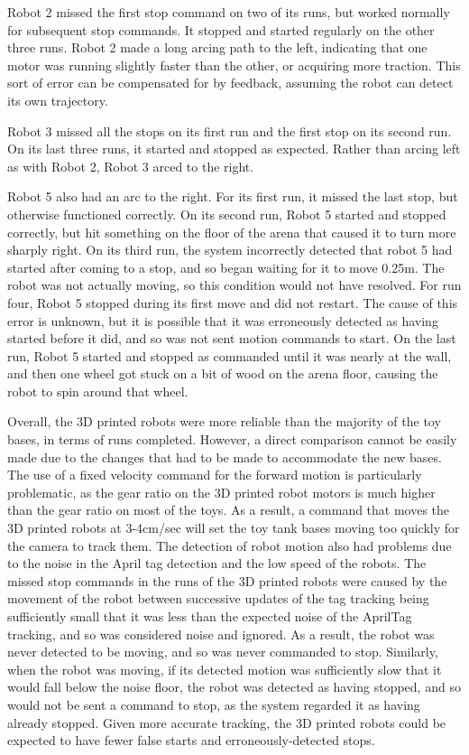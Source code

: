 Robot 2 missed the first stop command on two of its runs, but worked normally for subsequent stop commands. 
It stopped and started regularly on the other three runs.
Robot 2 made a long arcing path to the left, indicating that one motor was running slightly faster than the other, or acquiring more traction.
This sort of error can be compensated for by feedback, assuming the robot can detect its own trajectory. 

Robot 3 missed all the stops on its first run and the first stop on its second run.
On its last three runs, it started and stopped as expected. 
Rather than arcing left as with Robot 2, Robot 3 arced to the right. 

Robot 5 also had an arc to the right. For its first run, it missed the last stop, but otherwise functioned correctly. 
On its second run, Robot 5 started and stopped correctly, but hit something on the floor of the arena that caused it to turn more sharply right. 
On its third run, the system incorrectly detected that robot 5 had started after coming to a stop, and so began waiting for it to move 0.25m. 
The robot was not actually moving, so this condition would not have resolved. 
For run four, Robot 5 stopped during its first move and did not restart.
The cause of this error is unknown, but it is possible that it was erroneously detected as having started before it did, and so was not sent motion commands to start. 
On the last run, Robot 5 started and stopped as commanded until it was nearly at the wall, and then one wheel got stuck on a bit of wood on the arena floor, causing the robot to spin around that wheel. 

Overall, the 3D printed robots were more reliable than the majority of the toy bases, in terms of runs completed. 
However, a direct comparison cannot be easily made due to the changes that had to be made to accommodate the new bases. 
The use of a fixed velocity command for the forward motion is particularly problematic, as the gear ratio on the 3D printed robot motors is much higher than the gear ratio on most of the toys. 
As a result, a command that moves the 3D printed robots at 3-4cm/sec will set the toy tank bases moving too quickly for the camera to track them. 
The detection of robot motion also had problems due to the noise in the April tag detection and the low speed of the robots. 
The missed stop commands in the runs of the 3D printed robots were caused by the movement of the robot between successive updates of the tag tracking being sufficiently small that it was less than the expected noise of the AprilTag tracking, and so was considered noise and ignored. 
As a result, the robot was never detected to be moving, and so was never commanded to stop. 
Similarly, when the robot was moving, if its detected motion was sufficiently slow that it would fall below the noise floor, the robot was detected as having stopped, and so would not be sent a command to stop, as the system regarded it as having already stopped. 
Given more accurate tracking, the 3D printed robots could be expected to have fewer false starts and erroneously-detected stops.  


